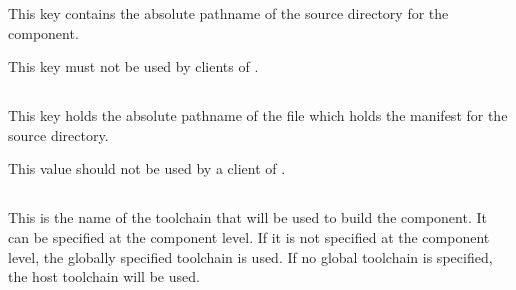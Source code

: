 This key contains the absolute pathname of the source directory for
the component.

This key must not be used by clients of \lmsbw.


\subsection{}\label{variables:source-mtree-manifest}

This key holds the absolute pathname of the file which holds the
\mtree manifest for the source directory.

This value should not be used by a client of \lmsbw.


\subsection{}\label{variables:toolchain}

This is the name of the toolchain that will be used to build the
component.  It can be specified at the component level.  If it is not
specified at the component level, the globally specified toolchain is
used.  If no global toolchain is specified, the host toolchain will be
used.

